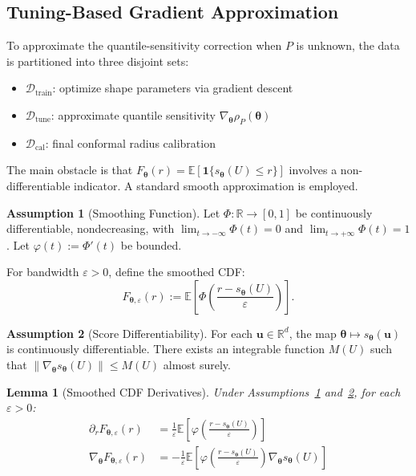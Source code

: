 \documentclass[lettersize,journal]{IEEEtran}
\newcommand{\R}{\mathbb{R}}
\newcommand{\E}{\mathbb{E}}
\newcommand{\cD}{\mathcal{D}}
\newcommand{\norm}[1]{\|#1\|}
\newcommand{\btheta}{\bm{\theta}}
\newcommand{\bu}{\bm{u}}
\newtheorem{lemma}[theorem]{Lemma}
\theoremstyle{definition}
\newtheorem{assumption}{Assumption}
\begin{document}
\subsection{Tuning-Based Gradient Approximation}

To approximate the quantile-sensitivity correction when $P$ is unknown, the data is partitioned into three disjoint sets:
\begin{itemize}
\item $\cD_{\text{train}}$: optimize shape parameters via gradient descent
\item $\cD_{\text{tune}}$: approximate quantile sensitivity $\nabla_{\btheta} \rho_P(\btheta)$
\item $\cD_{\text{cal}}$: final conformal radius calibration
\end{itemize}

The main obstacle is that $F_{\btheta}(r) = \E[\mathbf{1}\{s_{\btheta}(U) \leq r\}]$ involves a non-differentiable indicator. A standard smooth approximation is employed.

\begin{assumption}[Smoothing Function]\label{asm:smoothing}
Let $\Phi: \R \to [0,1]$ be continuously differentiable, nondecreasing, with $\lim_{t \to -\infty} \Phi(t) = 0$ and $\lim_{t \to +\infty} \Phi(t) = 1$. Let $\varphi(t) := \Phi'(t)$ be bounded.
\end{assumption}

For bandwidth $\varepsilon > 0$, define the smoothed CDF:
\begin{equation}\label{eq:smoothed-cdf}
F_{\btheta,\varepsilon}(r) := \E\left[\Phi\left(\frac{r - s_{\btheta}(U)}{\varepsilon}\right)\right].
\end{equation}

\begin{assumption}[Score Differentiability]\label{asm:score-diff}
For each $\bu \in \R^d$, the map $\btheta \mapsto s_{\btheta}(\bu)$ is continuously differentiable. There exists an integrable function $M(U)$ such that $\norm{\nabla_{\btheta} s_{\btheta}(U)} \leq M(U)$ almost surely.
\end{assumption}

\begin{lemma}[Smoothed CDF Derivatives]\label{lem:smoothed-derivatives}
Under Assumptions~\ref{asm:smoothing} and~\ref{asm:score-diff}, for each $\varepsilon > 0$:
\begin{align}
\partial_r F_{\btheta,\varepsilon}(r) &= \frac{1}{\varepsilon} \E\left[\varphi\left(\frac{r - s_{\btheta}(U)}{\varepsilon}\right)\right] \label{eq:dFr} \\
\nabla_{\btheta} F_{\btheta,\varepsilon}(r) &= -\frac{1}{\varepsilon} \E\left[\varphi\left(\frac{r - s_{\btheta}(U)}{\varepsilon}\right) \nabla_{\btheta} s_{\btheta}(U)\right] \label{eq:dFtheta}
\end{align}
\end{lemma}
\end{document}
